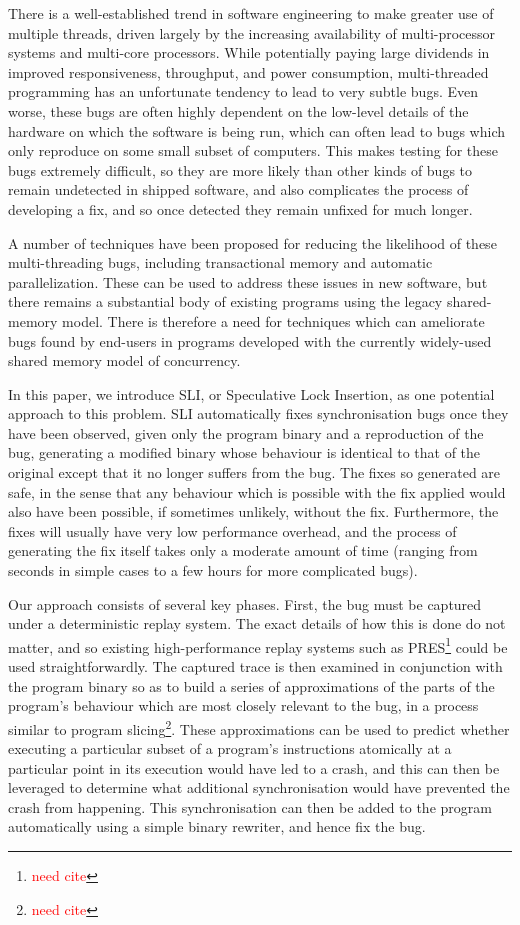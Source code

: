 \documentclass[10pt,twocolumn,preprint,natbib,authoryear]{sigplanconf}
\newcommand{\editorial}[1]{\textcolor{red}{\footnote{\textcolor{red}{#1}}}}
\newcommand{\needCite}{\editorial{need cite}}
\begin{document}
There is a well-established trend in software engineering to make
greater use of multiple threads, driven largely by the increasing
availability of multi-processor systems and multi-core processors.
While potentially paying large dividends in improved responsiveness,
throughput, and power consumption, multi-threaded programming has an
unfortunate tendency to lead to very subtle bugs.  Even worse, these
bugs are often highly dependent on the low-level details of the
hardware on which the software is being run, which can often lead to
bugs which only reproduce on some small subset of computers.  This
makes testing for these bugs extremely difficult, so they are more
likely than other kinds of bugs to remain undetected in shipped
software, and also complicates the process of developing a fix, and so
once detected they remain unfixed for much longer.

A number of techniques have been proposed for reducing the likelihood
of these multi-threading bugs, including transactional
memory\cite{Shavit1997} and automatic parallelization\cite{Bacon1994}.
These can be used to address these issues in new software, but there
remains a substantial body of existing programs using the legacy
shared-memory model.  There is therefore a need for techniques which
can ameliorate bugs found by end-users in programs developed with the
currently widely-used shared memory model of concurrency.

In this paper, we introduce SLI, or Speculative Lock Insertion, as one
potential approach to this problem.  SLI automatically fixes
synchronisation bugs once they have been observed, given only the
program binary and a reproduction of the bug, generating a modified
binary whose behaviour is identical to that of the original except
that it no longer suffers from the bug.  The fixes so generated are
safe, in the sense that any behaviour which is possible with the fix
applied would also have been possible, if sometimes unlikely, without
the fix.  Furthermore, the fixes will usually have very low
performance overhead, and the process of generating the fix itself
takes only a moderate amount of time (ranging from seconds in simple
cases to a few hours for more complicated bugs).

Our approach consists of several key phases.  First, the bug must be
captured under a deterministic replay system.  The exact details of
how this is done do not matter, and so existing high-performance
replay systems such as PRES\needCite{} could be used
straightforwardly.  The captured trace is then examined in conjunction
with the program binary so as to build a series of approximations of
the parts of the program's behaviour which are most closely relevant
to the bug, in a process similar to program slicing\needCite{}.  These
approximations can be used to predict whether executing a particular
subset of a program's instructions atomically at a particular point in
its execution would have led to a crash, and this can then be
leveraged to determine what additional synchronisation would have
prevented the crash from happening.  This synchronisation can then be
added to the program automatically using a simple binary rewriter, and
hence fix the bug.
\end{document}
